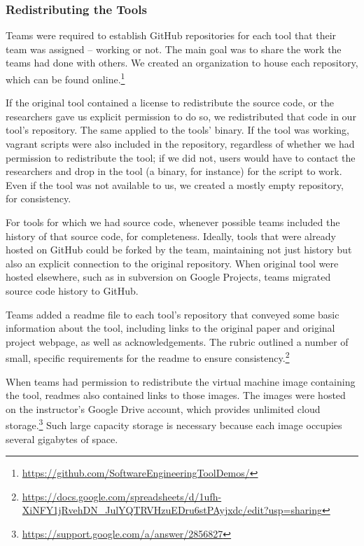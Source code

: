 \documentclass[10pt,conference]{IEEEtran}
\begin{document}
\subsubsection{Redistributing the Tools}

Teams were required to establish GitHub repositories 
for each tool that their team was assigned -- working or not.
The main goal was to share the work the teams had 
done with others.
We created an organization to house each repository,
which can be found 
online.\footnote{\url{https://github.com/SoftwareEngineeringToolDemos/}}

If the original tool contained a license to redistribute
the source code, or the researchers gave us explicit
permission to do so, we redistributed that code 
in our tool's repository.
The same applied to the tools' binary.
If the tool was working, 
vagrant scripts were also included in the repository,
regardless of whether we had permission to redistribute
the tool; if we did not, users would have to contact the 
researchers and drop in the tool (a binary, for instance)
for the script to work.
Even if the tool was not available to us, we created
a mostly empty repository, for consistency.


For tools for which we had source code,
whenever possible teams included the history
of that source code, for completeness.
Ideally, tools that were already hosted
on GitHub could be forked by the team,
maintaining not just history but also an 
explicit connection to the original repository.
When original tool were hosted elsewhere, such
as in subversion on Google Projects, 
teams migrated source code history to GitHub.

Teams added a readme file to each tool's repository
that conveyed some basic information about
the tool, including 
links to the original paper and
original project webpage, 
as well as acknowledgements.
The rubric outlined a number of small,
specific requirements for the readme to
ensure consistency.\footnote{\url{https://docs.google.com/spreadsheets/d/1ufh-XiNFY1jRvehDN_JulYQTRVHzuEDru6stPAyjxdc/edit?usp=sharing}}

When teams had permission to redistribute
the virtual machine image containing the tool,
readmes also contained links to those images.
The images were hosted on the instructor's 
Google Drive account, which provides unlimited
cloud storage.\footnote{\url{https://support.google.com/a/answer/2856827}}
Such large capacity storage is necessary because each
image occupies several gigabytes of space.
\end{document}
